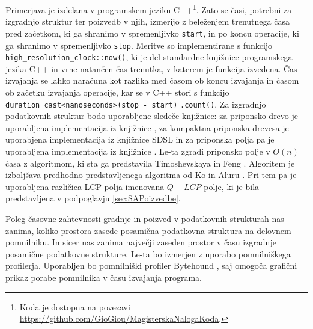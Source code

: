 Primerjava je izdelana v programskem jeziku C++\footnote{Koda je dostopna na povezavi \url{https://github.com/GioGiou/MagisterskaNalogaKoda}.}. Zato se časi, potrebni za izgradnjo struktur ter poizvedb v njih, izmerijo z beleženjem trenutnega časa pred začetkom, ki ga shranimo v spremenljivko \verb|start|, in po koncu operacije, ki ga shranimo v spremenljivko \verb|stop|. Meritve so implementirane s funkcijo \verb|high_resolution_clock::now()|, ki je del standardne knjižnice programskega jezika C++ in vrne natančen čas trenutka, v katerem je funkcija izvedena. Čas izvajanja se lahko naračuna kot razlika med časom ob koncu izvajanja in časom ob začetku izvajanja operacije, kar se v C++ stori s funkcijo \verb|duration_cast<nanoseconds>(stop - start)| \verb|.count()|. Za izgradnjo podatkovnih struktur bodo uporabljene sledeče knjižnice: za priponsko drevo je uporabljena implementacija iz knjižnice \cite{ganeshk13}, za kompaktna priponska drevesa je uporabjena implementacija iz knjižnice SDSL \cite{gbmp2014sea} in za priponska polja pa je uporabljena implementacija iz knjižnice \cite{Grebnov2025}. Le-ta zgradi priponsko polje v $O(n)$ časa z algoritmom, ki sta ga predstavila Timoshevskaya in Feng \cite{Timoshevskaya2014}. Algoritem je izboljšava predhodno predstavljenega algoritma od Ko in Aluru \cite{Ko2005}. Pri tem pa je uporabljena različica LCP polja imenovana $Q-LCP$ polje, ki je bila predstavljena v podpoglavju \ref{sec:SAPoizvedbe}.

Poleg časovne zahtevnosti gradnje in poizved v podatkovnih strukturah nas zanima, koliko prostora zasede posamična podatkovna struktura  na delovnem pomnilniku. In sicer nas zanima največji zaseden prostor v času izgradnje posamične podatkovne strukture. Le-ta bo izmerjen z uporabo pomnilniškega profilerja. Uporabljen bo pomnilniški profiler Bytehound \cite{Bytehound2024}, saj omogoča grafični prikaz porabe pomnilnika v času izvajanja programa.

